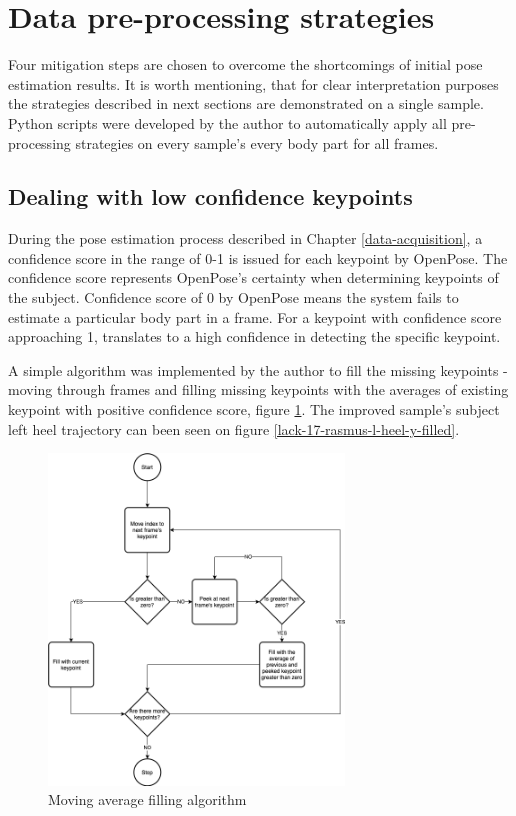 \section{Data pre-processing strategies}
\label{data-pre-processing-strategies}

Four mitigation steps are chosen to overcome the shortcomings of initial pose estimation results. It is worth mentioning, that for clear interpretation purposes the strategies described in next sections are demonstrated on a single sample. Python scripts were developed by the author to automatically apply all pre-processing strategies on every sample's every body part for all frames.

\subsection{Dealing with low confidence keypoints}

During the pose estimation process described in Chapter \ref{data-acquisition}, a confidence score in the range of 0-1 is issued for each keypoint by OpenPose. The confidence score represents OpenPose's certainty when determining keypoints of the subject. Confidence score of 0 by OpenPose means the system fails to estimate a particular body part in a frame. For a keypoint with confidence score approaching 1, translates to a high confidence in detecting the specific keypoint. 

A simple algorithm was implemented by the author to fill the missing keypoints - moving through frames and filling missing keypoints with the averages of existing keypoint with positive confidence score, figure \ref{moving-average-filling-algorithm}. The improved sample's subject left heel trajectory can been seen on figure \ref{lack-17-rasmus-l-heel-y-filled}.

\begin{figure}[htb]
  \centering
    \includegraphics[width=0.7\textwidth,keepaspectratio]
    {images/data-preprocessing/moving-average-filling-algorithm}
    \caption{Moving average filling algorithm}
    \label{moving-average-filling-algorithm}
\end{figure}

